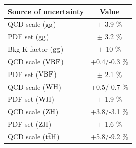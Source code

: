 \begin{table}[!htb]
\begin{center}
\small
\begin{tabular}{l|c}
\hline %
Source of uncertainty & Value \\
\hline
QCD scale (${\rm gg}$) & $\pm$ 3.9 \% \\
PDF set (${\rm gg}$) & $\pm$ 3.2 \% \\
Bkg K factor (${\rm gg}$) & $\pm$ 10 \% \\
\hline
QCD scale (${\rm VBF}$) & +0.4/-0.3 \% \\
PDF set (${\rm VBF}$) & $\pm$ 2.1 \% \\
\hline
QCD scale (${\rm WH}$) & +0.5/-0.7 \% \\
PDF set (${\rm WH}$) & $\pm$ 1.9 \% \\
\hline
QCD scale (${\rm ZH}$) & +3.8/-3.1 \% \\
PDF set (${\rm ZH}$) & $\pm$ 1.6 \% \\
\hline
QCD scale (${\rm t\bar{t}H}$) & +5.8/-9.2 \% \\

\end{tabular}
\end{center}
\end{table}
